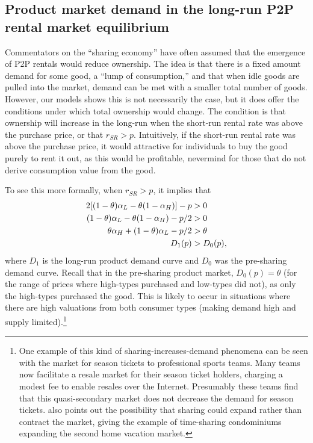 \documentclass[11pt]{article}
\begin{document}
\subsection{Product market demand in the long-run P2P rental market equilibrium} 

Commentators on the ``sharing economy'' have often assumed that the emergence of P2P rentals would reduce ownership. 
The idea is that there is a fixed amount demand for some good, a ``lump of consumption,'' and that when idle goods are pulled into the market, demand can be met with a smaller total number of goods.
However, our models shows this is not necessarily the case, but it does offer the conditions under which total ownership would change.
The condition is that ownership will increase in the long-run when the short-run rental rate was above the purchase price, or that $r_{SR} > p$. 
Intuitively, if the short-run rental rate was above the purchase price, it would attractive for individuals to buy the good purely to rent it out, as this would be profitable, nevermind for those that do not derive consumption value from the good. 

To see this more formally, when $r_{SR} > p$, it implies that
\begin{align}
 2[(1- \theta) \alpha_L - \theta(1 - \alpha_H)] - p &> 0 \notag \\
(1- \theta) \alpha_L - \theta(1 - \alpha_H) - p/2 &> 0 \notag \\
\theta \alpha_H + (1- \theta) \alpha_L - p/2 &> \theta \notag \\
 D_{1}(p) & > D_{0}(p), \notag \\
\end{align}
where $D_{1}$ is the long-run product demand curve and $D_{0}$ was the pre-sharing demand curve.
Recall that in the pre-sharing product market, $D_0(p) = \theta$ (for the range of prices where high-types purchased and low-types did not), as only the high-types purchased the good. 
This is likely to occur in situations where there are high valuations from both consumer types (making demand high and supply limited).\footnote{ 
  One example of this kind of sharing-increases-demand phenomena can be seen with the market for season tickets to professional sports teams.
  Many teams now facilitate a resale market for their season ticket holders, charging a modest fee to enable resales over the Internet.
  Presumably these teams find that this quasi-secondary market does not decrease the demand for season tickets.
  \cite{belk2014you} also points out the possibility that sharing could expand rather than contract the market, giving the example of time-sharing condominiums expanding the second home vacation market. 
}
\end{document}
